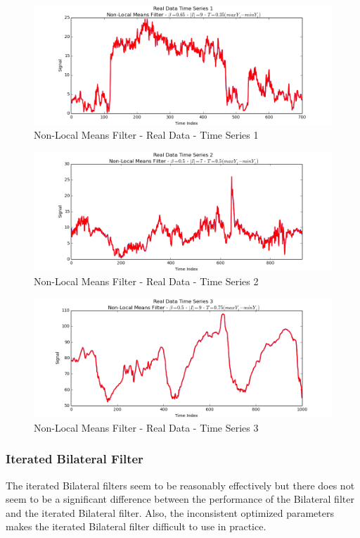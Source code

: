 \documentclass[11pt]{article}
\theoremstyle{definition}
\begin{document}
\begin{figure}
\centering
\includegraphics[width = 0.75 \textwidth]{NLMeansRealSignal1.png}
\caption{Non-Local Means Filter - Real Data - Time Series 1}
\label{nlmeansrealsignal1}
\end{figure}

\begin{figure}
\centering
\includegraphics[width = 0.75 \textwidth]{NLMeansRealSignal2.png}
\caption{Non-Local Means Filter - Real Data - Time Series 2}
\label{nlmeansrealsignal2}
\end{figure}

\begin{figure}
\centering
\includegraphics[width = 0.75 \textwidth]{NLMeansRealSignal3.png}
\caption{Non-Local Means Filter - Real Data - Time Series 3}
\label{nlmeansrealsignal3}
\end{figure}

\newpage

\subsubsection{Iterated Bilateral Filter}

The iterated Bilateral filters seem to be reasonably effectively but there does not seem to be a significant difference between the performance of the Bilateral filter and the iterated Bilateral filter. Also, the inconsistent optimized  parameters makes the iterated Bilateral filter difficult to use in practice.
\end{document}
